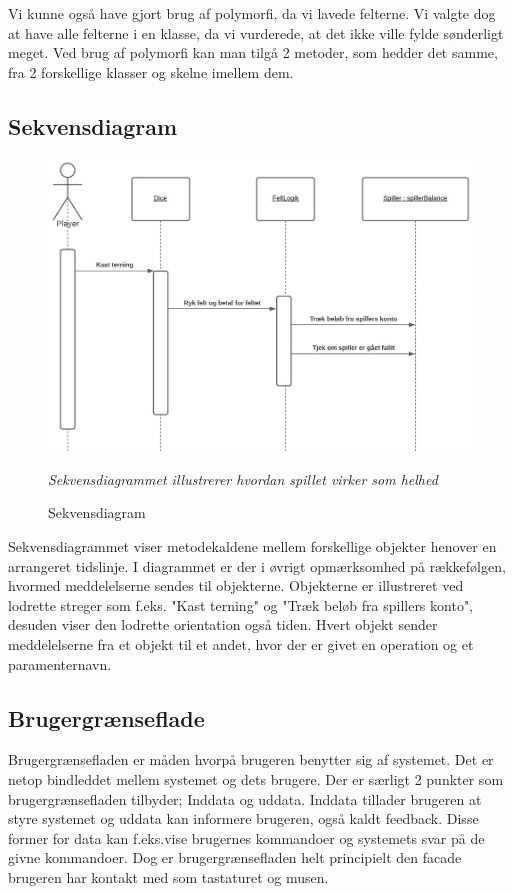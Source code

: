 Vi kunne også have gjort brug af polymorfi, da vi lavede felterne. Vi valgte dog at have alle felterne i en klasse, da vi vurderede, at det ikke ville fylde sønderligt meget. Ved brug af polymorfi kan man tilgå 2 metoder, som hedder det samme, fra 2 forskellige klasser og skelne imellem dem. 
        
\subsection{Sekvensdiagram}
    \begin{figure}[H]
        \centering
        \includegraphics[width=15cm]{figures/systemSekvensDiagram.JPG}
        \caption{Sekvensdiagram}
        \emph{Sekvensdiagrammet illustrerer hvordan spillet virker som helhed}
    \end{figure}
    
Sekvensdiagrammet viser metodekaldene mellem forskellige objekter henover en arrangeret tidslinje. I diagrammet er der i øvrigt opmærksomhed på rækkefølgen, hvormed meddelelserne sendes til objekterne. 
Objekterne er illustreret ved lodrette streger som f.eks. "Kast terning" og "Træk beløb fra spillers konto", desuden viser den lodrette orientation også tiden. Hvert objekt sender meddelelserne fra et objekt til et andet, hvor der er givet en operation og et paramenternavn.  

\subsection{Brugergrænseflade}

Brugergrænsefladen er måden hvorpå brugeren benytter sig af systemet. Det er netop bindleddet mellem systemet og dets brugere. Der er særligt 2 punkter som brugergrænsefladen tilbyder; Inddata og uddata. Inddata tillader brugeren at styre systemet og uddata kan informere brugeren, også kaldt feedback. Disse former for data kan f.eks.vise brugernes kommandoer og systemets svar på de givne kommandoer. Dog er brugergrænsefladen helt principielt den facade brugeren har kontakt med som tastaturet og musen.

